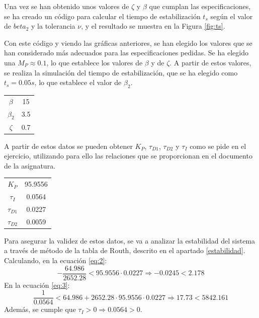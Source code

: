 \documentclass[a4paper]{article}
\begin{document}
Una vez se han obtenido unos valores de $\zeta$ y $\beta$ que cumplan las especificaciones, se ha creado un código para calcular el tiempo de estabilización $t_s$ según el valor de $beta_2$ y la tolerancia $\nu$, y el resultado se muestra en la Figura \ref{fig:ts}.

Con este código y viendo las gráficas anteriores, se han elegido los valores que se han considerado más adecuados para las especificaciones pedidas. Se ha elegido una $M_P \approx 0.1$, lo que establece los valores de $\beta$ y de $\zeta$. A partir de estos valores, se realiza la simulación del tiempo de estabilización, que se ha elegido como $t_s = 0.05 s$, lo que establece el valor de $\beta_2$.

\begin{center}
	\begin{tabular}{c|c}
			$\beta$ & 15 \\
			$\beta_2$ & 3.5 \\
			$\zeta$ & 0.7 \\
	\end{tabular}
\end{center}

A partir de estos datos se pueden obtener $K_P$, $\tau_{D1}$, $\tau_{D2}$ y $\tau_I$ como se pide en el ejercicio, utilizando para ello las relaciones que se proporcionan en el documento de la asignatura.


\begin{center}
	\begin{tabular}{c|c}
		$K_P$ & 95.9556 \\
		$\tau_I$ & 0.0564 \\
		$\tau_{D1}$ & 0.0227 \\
		$\tau_{D2}$ & 0.0059 \\
	\end{tabular}
\end{center}

Para asegurar la validez de estos datos, se va a analizar la estabilidad del sistema a través de método de la tabla de Routh, descrito en el apartado \ref{estabilidad}.
Calculando, en la ecuación \ref{eq:2}:
\begin{equation}
	-\frac{64.986}{2652.28}< 95.9556\cdot0.0227 \Rightarrow
	-0.0245<2.178
\end{equation}
En la ecuación \ref{eq:3}:
\begin{equation}
	\frac{1}{0.0564} < 64.986+2652.28\cdot95.9556\cdot0.0227 \Rightarrow
	17.73<5842.161
\end{equation}
Además, se cumple que $\tau_I > 0 \Rightarrow 0.0564>0$.
\end{document}
